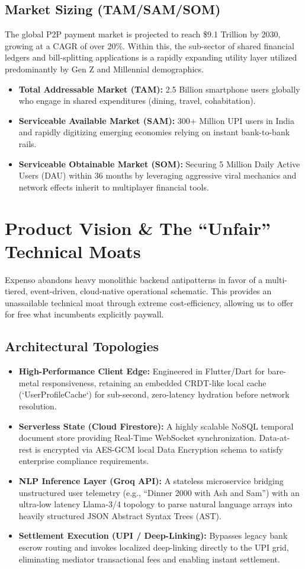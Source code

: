 \documentclass[11pt, letterpaper]{article}
\begin{document}
\subsection{Market Sizing (TAM/SAM/SOM)}
The global P2P payment market is projected to reach \$9.1 Trillion by 2030, growing at a CAGR of over 20\%. Within this, the sub-sector of shared financial ledgers and bill-splitting applications is a rapidly expanding utility layer utilized predominantly by Gen Z and Millennial demographics.
\begin{itemize}
    \item \textbf{Total Addressable Market (TAM):} 2.5 Billion smartphone users globally who engage in shared expenditures (dining, travel, cohabitation).
    \item \textbf{Serviceable Available Market (SAM):} 300+ Million UPI users in India and rapidly digitizing emerging economies relying on instant bank-to-bank rails.
    \item \textbf{Serviceable Obtainable Market (SOM):} Securing 5 Million Daily Active Users (DAU) within 36 months by leveraging aggressive viral mechanics and network effects inherit to multiplayer financial tools.
\end{itemize}

\section{Product Vision \& The ``Unfair'' Technical Moats}
Expenso abandons heavy monolithic backend antipatterns in favor of a multi-tiered, event-driven, cloud-native operational schematic. This provides an unassailable technical moat through extreme cost-efficiency, allowing us to offer for free what incumbents explicitly paywall.

\subsection{Architectural Topologies}
\begin{itemize}
    \item \textbf{High-Performance Client Edge:} Engineered in Flutter/Dart for bare-metal responsiveness, retaining an embedded CRDT-like local cache (`UserProfileCache`) for sub-second, zero-latency hydration before network resolution. 
    \item \textbf{Serverless State (Cloud Firestore):} A highly scalable NoSQL temporal document store providing Real-Time WebSocket synchronization. Data-at-rest is encrypted via AES-GCM local Data Encryption schema to satisfy enterprise compliance requirements.
    \item \textbf{NLP Inference Layer (Groq API):} A stateless microservice bridging unstructured user telemetry (e.g., ``Dinner 2000 with Ash and Sam'') with an ultra-low latency Llama-3/4 topology to parse natural language arrays into heavily structured JSON Abstract Syntax Trees (AST).
    \item \textbf{Settlement Execution (UPI / Deep-Linking):} Bypasses legacy bank escrow routing and invokes localized deep-linking directly to the UPI grid, eliminating mediator transactional fees and enabling instant settlement.
\end{itemize}
\end{document}
